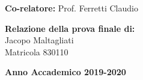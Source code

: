 \begin{titlepage}
    \noindent
    {\large \textbf{Co-relatore:} Prof. Ferretti Claudio }

    \vspace{15mm}

    \begin{flushright}
        {\large \textbf{Relazione della prova finale di:}} \\
        \large{Jacopo Maltagliati} \\
        \large{Matricola 830110}
    \end{flushright}

    \vspace{2mm}

    \begin{center}
        {\large{\bf Anno Accademico 2019-2020}}
    \end{center}

    \restoregeometry

\end{titlepage}
